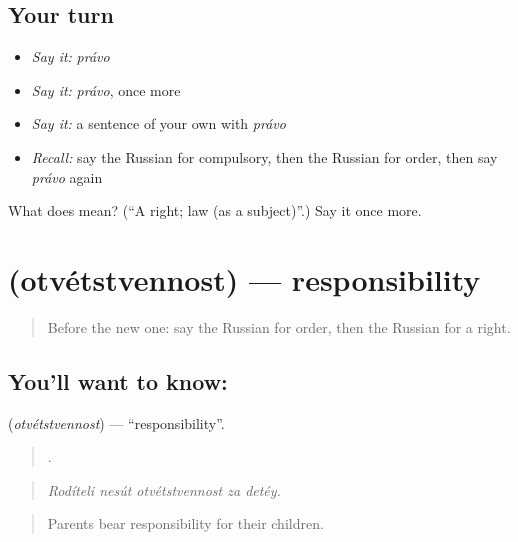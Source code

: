 \subsection*{Your turn}
\begin{itemize}
\raggedright
  \item \emph{Say it:} \emph{právo}
  \item \emph{Say it:} \emph{právo}, once more
  \item \emph{Say it:} a sentence of your own with \emph{právo}
  \item \emph{Recall:} say the Russian for compulsory, then the Russian for order, then say \emph{právo} again
\end{itemize}

\begin{tcolorbox}[breakable,colback=teal!4,colframe=teal!35!black,title={Before you move on}]
What does  mean? (\textquotedblleft{}A right; law (as a subject)\textquotedblright{}.) Say it once more.
\end{tcolorbox}
\section[\texorpdfstring{\ru{ответственность} (otvétstvennost)}{ответственность (otvétstvennost)}]{ (otvétstvennost) — responsibility}

\label{lesson:RU-C390-otvetstvennost}



\begin{quote}
Before the new one: say the Russian for order, then the Russian for a right.
\end{quote}

\subsection*{You'll want to know: }
\textbf{} (\emph{otvétstvennost}) — \textquotedblleft{}responsibility\textquotedblright{}.

\begin{quote}
    .
\end{quote}

\begin{quote}
\emph{Rodíteli nesút otvétstvennost za detéy.}
\end{quote}

\begin{quote}
Parents bear responsibility for their children.
\end{quote}

